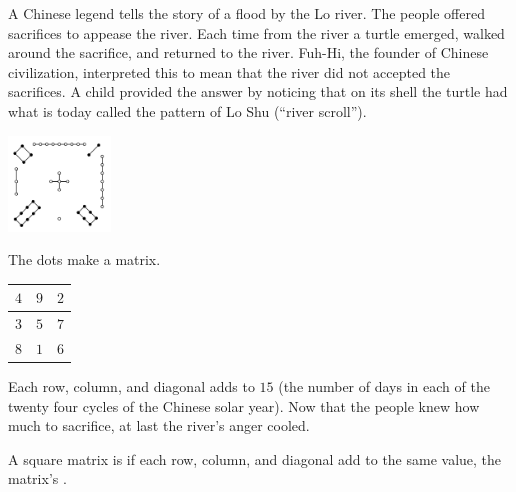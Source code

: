A Chinese legend tells the story of a  
flood by the Lo river.
The people offered sacrifices to appease the river.
Each time from the river a turtle emerged, 
walked around the sacrifice, and returned to the river.
Fuh-Hi, %
the founder of Chinese civilization,
interpreted this to mean that
the river did not accepted the sacrifices.  
A child provided the answer by noticing 
that on its shell the turtle had what is today
called the pattern of Lo Shu (``river scroll'').
\begin{center}
  \includegraphics[height=1in]{LoShu.png}
\end{center}
The dots make a matrix.
\begin{center}
  \begin{tabular}{|c|c|c|}
    \hline
      $4$  &$9$  &$2$  \\ \hline
      $3$  &$5$  &$7$  \\ \hline
      $8$  &$1$  &$6$  \\ \hline    
  \end{tabular}
\end{center}
Each row, column, 
and diagonal adds to $15$
(the number of days in each of the twenty four cycles of the 
Chinese solar year).
Now that the people knew how much to sacrifice, at last the river's anger cooled.

A square matrix is 
if each row, column, and diagonal add to the same
value, the matrix's .

